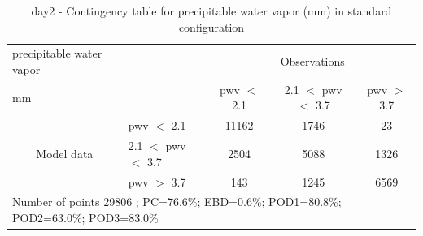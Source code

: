 \begin{table}[p!]
\begin{center}
\begin{tabular}{llccc}
\hline
{precipitable water vapor}                                       &                                                    & \multicolumn{3}{c}{Observations}                 \\
{mm}                                       &                             & pwv $<$ 2.1   & 2.1 $<$ pwv $<$ 3.7 & pwv $>$ 3.7 \\
\hline
\multicolumn{1}{c}{\multirow{3}{*}{Model data}}  & pwv $<$ 2.1             & 11162                & 1746                       & 23              \\
                                                 & 2.1  $<$ pwv $<$ 3.7 & 2504                & 5088                       & 1326              \\
                                                 & pwv $>$ 3.7             & 143                & 1245                       & 6569              \\
\hline
\multicolumn{5}{l}{ Number of points        29806 ; PC=76.6\%; EBD=0.6\%; POD1=80.8\%; POD2=63.0\%; POD3=83.0\%}                 \\
\end{tabular}
\end{center}
\caption{day2 - Contingency table for  precipitable water vapor (mm) in standard configuration  }
\label{tab:contingencypwvBEF:day2}
\end{table}
